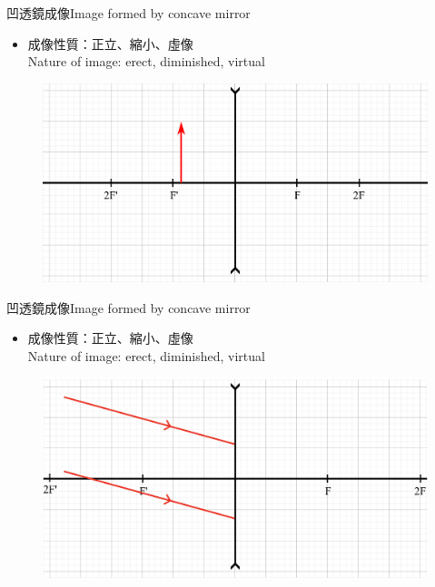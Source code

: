 \documentclass[beamer=true]{standalone}
\begin{document}
\begin{frame}{凹透鏡成像Image formed by concave mirror}
    \begin{itemize}
        \item 成像性質：正立、縮小、虛像
              \\Nature of image: erect, diminished, virtual
    \end{itemize}
    \begin{figure}
        \centering
        \includegraphics[width=1\linewidth]{assets/d9qwni0d9nwqdqw.png}
    \end{figure}
\end{frame}

\begin{frame}{凹透鏡成像Image formed by concave mirror}
    \begin{itemize}
        \item 成像性質：正立、縮小、虛像
              \\Nature of image: erect, diminished, virtual
    \end{itemize}
    \begin{figure}
        \centering
        \includegraphics[width=1\linewidth]{assets/nud98u2dn32.png}


    \end{figure}
\end{frame}
\end{document}
